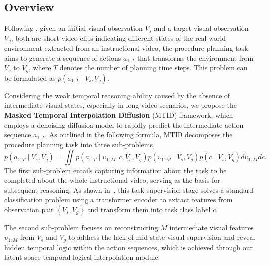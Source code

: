 \subsection{Overview}
\label{method1}

Following \citet{chang2020procedure}, given an initial visual observation $V_s$ and a target visual observation $V_g$, both are short video clips indicating different states of the real-world environment extracted from an instructional video, the procedure planning task aims to generate a sequence of actions $a_{1:T}$ that transforms the environment from $V_s$ to $V_g$, where $T$ denotes the number of planning time steps. This problem can be formulated as $p(a_{1:T} \mid V_s, V_g)$. 

Considering the weak temporal reasoning ability caused by the absence of intermediate visual states, especially in long video scenarios, we propose the \textbf{Masked Temporal Interpolation Diffusion} (MTID) framework, which employs a denoising diffusion model to rapidly predict the intermediate action sequence $a_{1:T}$. As outlined in the following formula, MTID decomposes the procedure planning task into three sub-problems, 
\begin{equation} 
    p(a_{1:T} \mid V_{s}, V_{g}) = \iint p(a_{1:T} \mid \upsilon_{1:M}, c, V_{s}, V_{g}) p(\upsilon_{1:M} \mid V_{s}, V_{g}) p(c \mid V_{s}, V_{g}) d\upsilon_{1:M} dc .
    \label{eq:1}
\end{equation}
The first sub-problem entails capturing information about the task to be completed about the whole instructional video, serving as the basis for subsequent reasoning. 
As shown in~, this task supervision stage solves a standard classification problem using a transformer encoder to extract features from observation pair $\left\{ {V_s, V_g} \right\}$ and transform them into task class label $c$.

The second sub-problem focuses on reconstructing $M$ intermediate visual features $\upsilon_{1:M}$ from $V_s$ and $V_g$ to address the lack of mid-state visual supervision and reveal hidden temporal logic within the action sequences, which is achieved through our latent space temporal logical interpolation module. 

